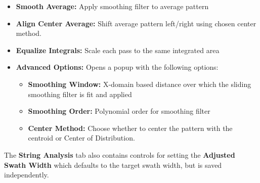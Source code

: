 \documentclass[10pt,letterpaper,titlepage]{article}
\begin{document}
    \begin{itemize}
        \item \textbf{Smooth Average:} Apply smoothing filter to average pattern
        \item \textbf{Align Center Average:} Shift average pattern left/right using chosen center method.
        \item \textbf{Equalize Integrals:} Scale each pass to the same integrated area
        \item \textbf{Advanced Options:} Opens a popup with the following options:
        \begin{itemize}
            \item \textbf{Smoothing Window:} X-domain based distance over which the sliding smoothing filter is fit and applied
            \item \textbf{Smoothing Order:} Polynomial order for smoothing filter
            \item \textbf{Center Method:} Choose whether to center the pattern with the centroid or Center of Distribution.
        \end{itemize}
    \end{itemize}
    The \textbf{String Analysis} tab also contains controls for setting the \textbf{Adjusted Swath Width} which defaults to the target swath width, but is saved independently.
    \newpage
\end{document}
